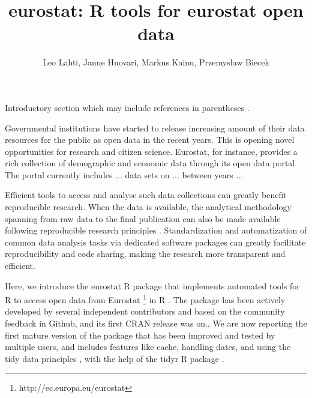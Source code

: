 \title{eurostat: R tools for eurostat open data}
\author{Leo Lahti, Janne Huovari, Markus Kainu, Przemyslaw Biecek}

\maketitle




Introductory section which may include references in parentheses
\citep{R}.

Governmental institutions have started to release increasing amount of
their data resources for the public as open data in the recent
years. This is opening novel opportunities for research and citizen
science. Eurostat, for instance, provides a rich collection of
demographic and economic data through its open data portal. The portal
currently includes ... data sets on ... between years ...

Efficient tools to access and analyse such data collections can
greatly benefit reproducible research. When the data is available, the
analytical methodology spanning from raw data to the final publication
can also be made available following reproducible research principles
\citep{Gandrud13}. Standardization and automatization of
common data analysis tasks via dedicated software packages can greatly
facilitate reproducibility and code sharing, making the research more
transparent and efficient.

Here, we introduce the eurostat R package that implements automated
tools for R to access open data from
Eurostat \footnote{http://ec.europa.eu/eurostat} in
R \citep{R}. The package has been actively developed by several
independent contributors and based on the community feedback in
Github, and its first CRAN release was on.. We are now reporting the
first mature version of the package that has been improved and tested
by multiple users, and includes features like cache, handling dates,
and using the tidy data principles \citep{wickham2014}, with the help of
the tidyr R package \citep{tidyr}.

